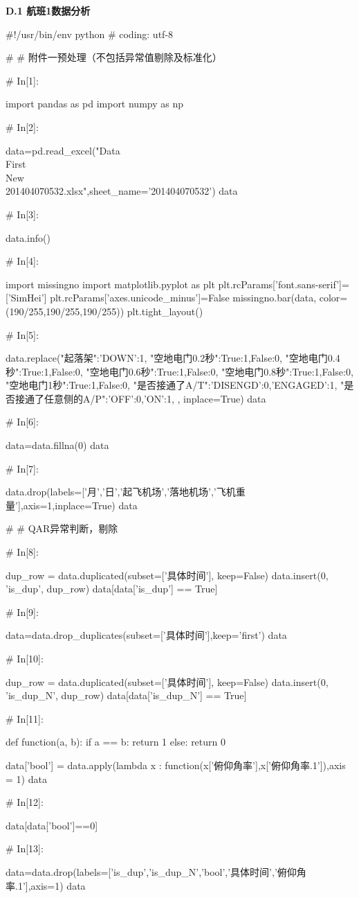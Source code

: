 \documentclass{MathorCupModeling}
\begin{document}
\newpage


\textbf{D.1 航班1数据分析}
\begin{python}
#!/usr/bin/env python
# coding: utf-8

# # 附件一预处理（不包括异常值剔除及标准化）

# In[1]:


import pandas as pd
import numpy as np


# In[2]:


data=pd.read_excel("Data\\First\\New\\201404070532.xlsx",sheet_name='201404070532')
data


# In[3]:


data.info()


# In[4]:


import missingno
import matplotlib.pyplot as plt
plt.rcParams['font.sans-serif']=['SimHei']
plt.rcParams['axes.unicode_minus']=False
missingno.bar(data, color=(190/255,190/255,190/255))
plt.tight_layout()


# In[5]:


data.replace({"起落架":{'DOWN':1},
              "空地电门0.2秒":{True:1,False:0},
              "空地电门0.4秒":{True:1,False:0},
              "空地电门0.6秒":{True:1,False:0},
              "空地电门0.8秒":{True:1,False:0},
              "空地电门1秒":{True:1,False:0},
              "是否接通了A/T":{'DISENGD':0,'ENGAGED':1},
              "是否接通了任意侧的A/P":{'OFF':0,'ON':1},
              }, inplace=True)
data


# In[6]:


data=data.fillna(0)
data


# In[7]:


data.drop(labels=['月','日','起飞机场','落地机场','飞机重量'],axis=1,inplace=True)
data


# # QAR异常判断，剔除

# In[8]:


dup_row = data.duplicated(subset=['具体时间'], keep=False)
data.insert(0, 'is_dup', dup_row)
data[data['is_dup'] == True]


# In[9]:


data=data.drop_duplicates(subset=['具体时间'],keep='first')
data


# In[10]:


dup_row = data.duplicated(subset=['具体时间'], keep=False)
data.insert(0, 'is_dup_N', dup_row)
data[data['is_dup_N'] == True]


# In[11]:


def function(a, b):
    if a == b:
        return 1
    else:
        return 0


data['bool'] = data.apply(lambda x : function(x['俯仰角率'],x['俯仰角率.1']),axis = 1)
data


# In[12]:


data[data['bool']==0]


# In[13]:


data=data.drop(labels=['is_dup','is_dup_N','bool','具体时间','俯仰角率.1'],axis=1)
data


\end{python}
\end{document}
